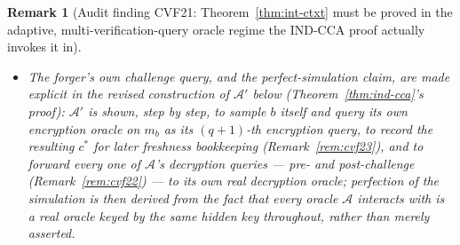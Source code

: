 \documentclass[11pt,a4paper]{article}
\newtheorem{remark}[theorem]{Remark}
\begin{document}
\begin{remark}[Audit finding CVF21: Theorem~\ref{thm:int-ctxt} must be proved in the adaptive, multi-verification-query oracle regime the IND-CCA proof actually invokes it in]
\begin{itemize}
        Theorem~\ref{thm:int-ctxt}'s bound has no $q$-dependent term at
        all for the IND-CCA proof to (mis)parametrise by $q+q_d$. This was
        gap~(i) above; it is moot under the current bound rather than
        requiring a corrected substitution.
  \item \emph{The forger's own challenge query, and the perfect-simulation
        claim, are made explicit} in the revised construction of
        $\mathcal{A}'$ below (Theorem~\ref{thm:ind-cca}'s proof):
        $\mathcal{A}'$ is shown, step by step, to sample $b$ itself and
        query its own encryption oracle on $m_b$ as its $(q\!+\!1)$-th
        encryption query, to record the resulting $c^*$ for later
        freshness bookkeeping (Remark~\ref{rem:cvf23}), and to forward
        every one of $\mathcal{A}$'s decryption queries --- pre- \emph{and}
        post-challenge (Remark~\ref{rem:cvf22}) --- to its own real
        decryption oracle; perfection of the simulation is then derived
        from the fact that every oracle $\mathcal{A}$ interacts with is a
        real oracle keyed by the same hidden key throughout, rather than
        merely asserted.
\end{itemize}
\end{remark}
\end{document}
